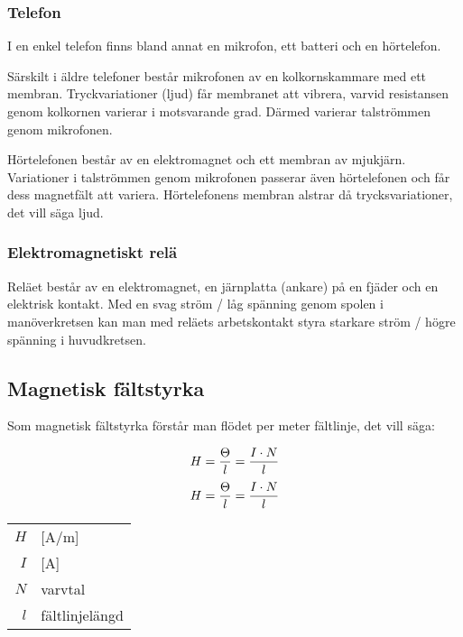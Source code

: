 \subsubsection{Telefon}
I en enkel telefon finns bland annat en mikrofon, ett batteri och en
hörtelefon.

Särskilt i äldre telefoner består mikrofonen av en kolkornskammare med ett
membran.
Tryckvariationer (ljud) får membranet att vibrera, varvid resistansen genom
kolkornen varierar i motsvarande grad.
Därmed varierar talströmmen genom mikrofonen.

Hörtelefonen består av en elektromagnet och ett membran av mjukjärn.
Variationer i talströmmen genom mikrofonen passerar även hörtelefonen och får dess
magnetfält att variera.
Hörtelefonens membran alstrar då trycksvariationer, det vill säga ljud.

\subsubsection{Elektromagnetiskt relä}
Reläet består av en elektromagnet, en järnplatta (ankare) på en fjäder och en
elektrisk kontakt.
Med en svag ström / låg spänning genom spolen i manöverkretsen kan man med
reläets arbetskontakt styra starkare ström / högre spänning i huvudkretsen.

\subsection{Magnetisk fältstyrka}
\label{magnetisk_fältstyrka}

Som magnetisk fältstyrka förstår man flödet per meter fältlinje, det vill säga:

\begin{equation*}
  H = \frac{\Theta}{l} = \frac{I \cdot N}{l} \\
\end{equation*}
%
\begin{equation*}
  H = \frac{\Theta}{l} = \frac{I \cdot N}{l} \\
\end{equation*}

\begin{table}[H]
	\centering
	\begin{tabular}{rl}
	$H$ & [A/m]\\
	$I$ & [A]\\
	$N$ & varvtal\\
	$l$ & fältlinjelängd\\
\end{tabular}
\end{table}

